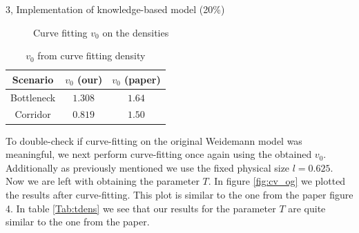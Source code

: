 \begin{task}{3, Implementation of knowledge-based model (20\%)}
\begin{figure}[H]
\centering
{}
\caption{Curve fitting $v_0$ on the densities}
\label{fig:cv_dens}
\end{figure}

\begin{table}[H]
\centering
\begin{tabular}{ |c|c|c| }
\hline
Scenario & $v_0$ (our) & $v_0$ (paper)\\
\hline
Bottleneck & $1.308$ & $1.64$\\
\hline
Corridor & $0.819$ & $1.50$\\
\hline
\end{tabular}
\caption{$v_0$ from curve fitting density}
\label{Tab:v0dens}
\end{table}

To double-check if curve-fitting on the original Weidemann model was meaningful, we next perform curve-fitting once again using the obtained $v_0$. Additionally as previously mentioned we use the fixed physical size $l=0.625$. Now we are left with obtaining the parameter $T$. In figure \ref{fig:cv_og} we plotted the results after curve-fitting. This plot is similar to the one from the paper \cite{tordeux2020prediction} figure 4. In table \ref{Tab:tdens} we see that our results for the parameter $T$  are quite similar to the one from the paper.


\end{task}
